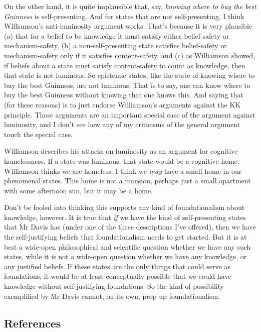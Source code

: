 \documentclass[
  11pt,
  letterpaper,
  DIV=11,
  numbers=noendperiod,
  twoside]{scrartcl}
\begin{document}
On the other hand, it is quite implausible that, say, \emph{knowing
where to buy the best Guinness} is self-presenting. And for states that
are not self-presenting, I think Williamson's anti-luminosity argument
works. That's because it is very plausible (a) that for a belief to be
knowledge it must satisfy either belief-safety or mechanism-safety, (b)
a non-self-presenting state satisfies belief-safety or mechanism-safety
only if it satisfies content-safety, and (c) as Williamson showed, if
beliefs about a state must satisfy content-safety to count as knowledge,
then that state is not luminous. So epistemic states, like the state of
knowing where to buy the best Guinness, are not luminous. That is to
say, one can know where to buy the best Guinness without knowing that
one knows this. And saying that (for these reasons) is to just endorse
Williamson's arguments against the KK principle. Those arguments are an
important special case of the argument against luminosity, and I don't
see how any of my criticisms of the general argument touch the special
case.

Williamson describes his attacks on luminosity as an argument for
cognitive homelessness. If a state was luminous, that state would be a
cognitive home. Williamson thinks we are homeless. I think we \emph{may}
have a small home in our phenomenal states. This home is not a mansion,
perhaps just a small apartment with some afternoon sun, but it may be a
home.

Don't be fooled into thinking this supports any kind of foundationalism
about knowledge, however. It is true that \emph{if} we have the kind of
self-presenting states that Mr Davis has (under one of the three
descriptions I've offered), then we have the self-justifying beliefs
that foundationalism needs to get started. But it is at best a wide-open
philosophical and scientific question whether we have any such states,
while it is not a wide-open question whether we have any knowledge, or
any justified beliefs. If these states are the only things that could
serve as foundations, it would be at least conceptually possible that we
could have knowledge without self-justifying foundations. So the kind of
possibility exemplified by Mr Davis cannot, on its own, prop up
foundationalism.

\subsection*{References}\label{references}
\end{document}
